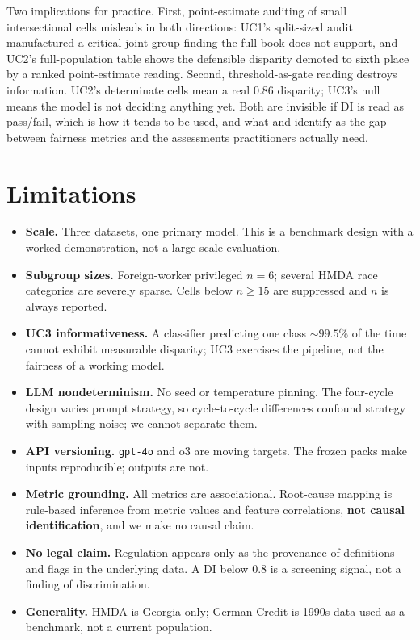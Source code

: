 \documentclass[10pt,letterpaper]{article}
\begin{document}
Two implications for practice. First, point-estimate auditing of small
intersectional cells misleads in both directions: UC1's split-sized audit
manufactured a critical joint-group finding the full book does not support,
and UC2's full-population table shows the defensible disparity demoted to
sixth place by a ranked point-estimate reading. Second, threshold-as-gate
reading destroys information. UC2's determinate cells mean a real $0.86$
disparity; UC3's null means the model is not deciding anything yet. Both are
invisible if DI is read as pass/fail, which is how it tends to be used, and
what \citet{stumpf2024} and \citet{kim2025} identify as the gap between
fairness metrics and the assessments practitioners actually need.

\section{Limitations}

\begin{itemize}[leftmargin=1.4em]
  \item \textbf{Scale.} Three datasets, one primary model. This is a benchmark
        design with a worked demonstration, not a large-scale evaluation.
  \item \textbf{Subgroup sizes.} Foreign-worker privileged $n{=}6$; several HMDA
        race categories are severely sparse. Cells below $n \geq 15$ are
        suppressed and $n$ is always reported.
  \item \textbf{UC3 informativeness.} A classifier predicting one class
        ${\sim}99.5\%$ of the time cannot exhibit measurable disparity; UC3
        exercises the pipeline, not the fairness of a working model.
  \item \textbf{LLM nondeterminism.} No seed or temperature pinning. The
        four-cycle design varies prompt strategy, so cycle-to-cycle differences
        confound strategy with sampling noise; we cannot separate them.
  \item \textbf{API versioning.} \texttt{gpt-4o} and o3 are moving targets. The
        frozen packs make inputs reproducible; outputs are not.
  \item \textbf{Metric grounding.} All metrics are associational. Root-cause
        mapping is rule-based inference from metric values and feature
        correlations, \textbf{not causal identification}, and we make no causal
        claim.
  \item \textbf{No legal claim.} Regulation appears only as the provenance of
        definitions and flags in the underlying data. A DI below $0.8$ is a
        screening signal, not a finding of discrimination.
  \item \textbf{Generality.} HMDA is Georgia only; German Credit is 1990s data
        used as a benchmark, not a current population.
\end{itemize}
\end{document}
